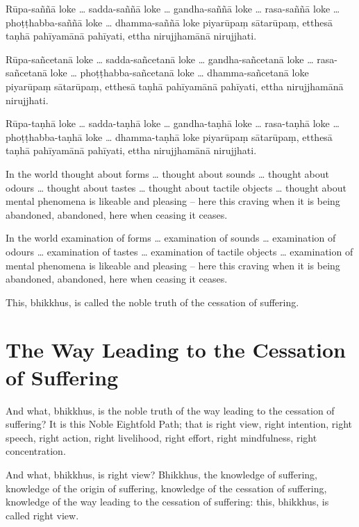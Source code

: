 Rūpa-saññā loke \ldots{} sadda-saññā loke \ldots{} gandha-saññā loke \ldots{}
rasa-saññā loke \ldots{} phoṭṭhabba-saññā loke \ldots{} dhamma-saññā loke piyarūpaṃ
sātarūpaṃ, etthesā taṇhā pahīyamānā pahīyati, ettha nirujjhamānā nirujjhati.

Rūpa-sañcetanā loke \ldots{} sadda-sañcetanā loke \ldots{} gandha-sañcetanā loke
\ldots{} rasa-sañcetanā loke \ldots{} phoṭṭhabba-sañcetanā loke \ldots{}
dhamma-sañcetanā loke piyarūpaṃ sātarūpaṃ, etthesā taṇhā pahīyamānā pahīyati,
ettha nirujjhamānā nirujjhati.

Rūpa-taṇhā loke \ldots{} sadda-taṇhā loke \ldots{} gandha-taṇhā loke \ldots{}
rasa-taṇhā loke \ldots{} phoṭṭhabba-taṇhā loke \ldots{} dhamma-taṇhā loke piyarūpaṃ
sātarūpaṃ, etthesā taṇhā pahīyamānā pahīyati, ettha nirujjhamānā nirujjhati.

\englishPage

In the world thought about forms \ldots{} thought about sounds \ldots{} thought
about odours \ldots{} thought about tastes \ldots{} thought about tactile
objects \ldots{} thought about mental phenomena is likeable and pleasing -- here
this craving when it is being abandoned, abandoned, here when ceasing it ceases.

In the world examination of forms \ldots{} examination of sounds \ldots{}
examination of odours \ldots{} examination of tastes \ldots{} examination of
tactile objects \ldots{} examination of mental phenomena is likeable and
pleasing -- here this craving when it is being abandoned, abandoned, here when
ceasing it ceases.

This, bhikkhus, is called the noble truth of the cessation of suffering.

\section{The Way Leading to the Cessation of Suffering}

And what, bhikkhus, is the noble truth of the way leading to the cessation of
suffering? It is this Noble Eightfold Path; that is right view, right intention,
right speech, right action, right livelihood, right effort, right mindfulness,
right concentration.

And what, bhikkhus, is right view? Bhikkhus, the knowledge of suffering,
knowledge of the origin of suffering, knowledge of the cessation of suffering,
knowledge of the way leading to the cessation of suffering: this, bhikkhus, is
called right view.

